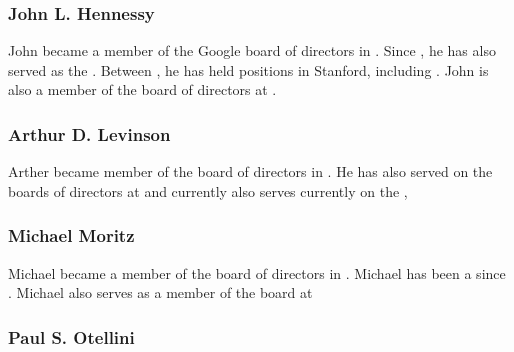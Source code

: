\documentclass[a4paper,12pt]{article}
\begin{document}
\subsubsection{John L. Hennessy}

John became a member of the Google board of directors in 
\cite[April 2004]{board}. Since \cite[September 2000]{board}, he has 
also served as the \cite[President of Stanford University]{board}. 
Between \cite[1994 and August 2000]{board}, he has held positions 
in Stanford, including \cite[Dean of the Stanford University School
of Engineering and Chair of the Stanford University Department of
Computer Science]{board}. John is also a member of the board of
directors at \cite[Cisco Systems and Atheros Communications]{board}. 
\cite[John holds a Master's degree and
Doctoral degree in computer science from the State University of New
York, Stony Brook and a Bachelor of Science degree in electrical
engineering from Villanova University.]{board}

\subsubsection{Arthur D. Levinson}

Arther became member of the board of directors in \cite[April
2004]{board}. He has also served on the boards of directors at 
\cite[Genentech]{board} and currently also serves currently on the 
\cite[Apple Computers]{board}, 
\cite[Arthur was a Postdoctoral Fellow in the Department of Microbiology at the
University of California, San Francisco. Art holds a Ph.D. in
biochemistry from Princeton University and a Bachelor of Science degree
in molecular biology from the University of Washington.]{board}

\subsubsection{Michael Moritz}

Michael became a member of the board of directors in
\cite[May 1999]{board}. Michael has been a 
\cite[General Partner of Sequoia Capital]{board} since
\cite[1986]{board}. Michael also serves as a member of the board at 
\cite[Saba Software and Flextronics International and RedEnvelope]{board}
\cite[Michael holds a Masters of Arts degree from Christ Church, 
University of Oxford.]{board}

\subsubsection{Paul S. Otellini}
\end{document}
